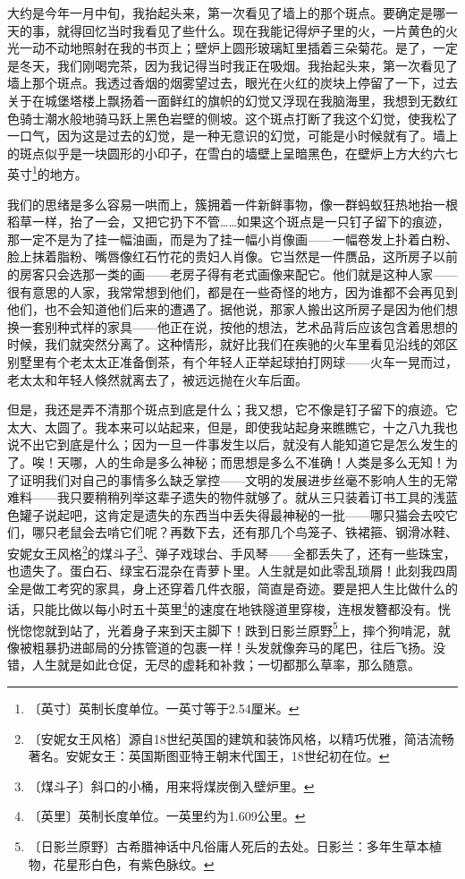 \documentclass[12pt,UTF-8,openany]{ctexbook}
\begin{document}
\begin{large}
    
    大约是今年一月中旬，我抬起头来，第一次看见了墙上的那个斑点。要确定是哪一天的事，就得回忆当时我看见了些什么。现在我能记得炉子里的火，一片黄色的火光一动不动地照射在我的书页上；壁炉上圆形玻璃缸里插着三朵菊花。是了，一定是冬天，我们刚喝完茶，因为我记得当时我正在吸烟。我抬起头来，第一次看见了墙上那个斑点。我透过香烟的烟雾望过去，眼光在火红的炭块上停留了一下，过去关于在城堡塔楼上飘扬着一面鲜红的旗帜的幻觉又浮现在我脑海里，我想到无数红色骑士潮水般地骑马跃上黑色岩壁的侧坡。这个斑点打断了我这个幻觉，使我松了一口气，因为这是过去的幻觉，是一种无意识的幻觉，可能是小时候就有了。墙上的斑点似乎是一块圆形的小印子，在雪白的墙壁上呈暗黑色，在壁炉上方大约六七英寸\footnote{〔英寸〕英制长度单位。一英寸等于2.54厘米。}的地方。
    
    我们的思绪是多么容易一哄而上，簇拥着一件新鲜事物，像一群蚂蚁狂热地抬一根稻草一样，抬了一会，又把它扔下不管……如果这个斑点是一只钉子留下的痕迹，那一定不是为了挂一幅油画，而是为了挂一幅小肖像画——一幅卷发上扑着白粉、脸上抹着脂粉、嘴唇像红石竹花的贵妇人肖像。它当然是一件赝品，这所房子以前的房客只会选那一类的画——老房子得有老式画像来配它。他们就是这种人家——很有意思的人家，我常常想到他们，都是在一些奇怪的地方，因为谁都不会再见到他们，也不会知道他们后来的遭遇了。据他说，那家人搬出这所房子是因为他们想换一套别种式样的家具——他正在说，按他的想法，艺术品背后应该包含着思想的时候，我们就突然分离了。这种情形，就好比我们在疾驰的火车里看见沿线的郊区别墅里有个老太太正准备倒茶，有个年轻人正举起球拍打网球——火车一晃而过，老太太和年轻人倏然就离去了，被远远抛在火车后面。
    
    但是，我还是弄不清那个斑点到底是什么；我又想，它不像是钉子留下的痕迹。它太大、太圆了。我本来可以站起来，但是，即使我站起身来瞧瞧它，十之八九我也说不出它到底是什么；因为一旦一件事发生以后，就没有人能知道它是怎么发生的了。唉！天哪，人的生命是多么神秘；而思想是多么不准确！人类是多么无知！为了证明我们对自己的事情多么缺乏掌控——文明的发展进步丝毫不影响人生的无常难料——我只要稍稍列举这辈子遗失的物件就够了。就从三只装着订书工具的浅蓝色罐子说起吧，这肯定是遗失的东西当中丢失得最神秘的一批——哪只猫会去咬它们，哪只老鼠会去啃它们呢？再数下去，还有那几个鸟笼子、铁裙箍、钢滑冰鞋、安妮女王风格\footnote{〔安妮女王风格〕源自18世纪英国的建筑和装饰风格，以精巧优雅，简洁流畅著名。安妮女王：英国斯图亚特王朝末代国王，18世纪初在位。}的煤斗子\footnote{〔煤斗子〕斜口的小桶，用来将煤炭倒入壁炉里。}、弹子戏球台、手风琴——全都丢失了，还有一些珠宝，也遗失了。蛋白石、绿宝石混杂在青萝卜里。人生就是如此零乱琐屑！此刻我四周全是做工考究的家具，身上还穿着几件衣服，简直是奇迹。要是把人生比做什么的话，只能比做以每小时五十英里\footnote{〔英里〕英制长度单位。一英里约为1.609公里。}的速度在地铁隧道里穿梭，连根发簪都没有。恍恍惚惚就到站了，光着身子来到天主脚下！跌到日影兰原野\footnote{〔日影兰原野〕古希腊神话中凡俗庸人死后的去处。日影兰：多年生草本植物，花星形白色，有紫色脉纹。}上，摔个狗啃泥，就像被粗暴扔进邮局的分拣管道的包裹一样！头发就像奔马的尾巴，往后飞扬。没错，人生就是如此仓促，无尽的虚耗和补救；一切都那么草率，那么随意。
    

\end{large}
\end{document}
